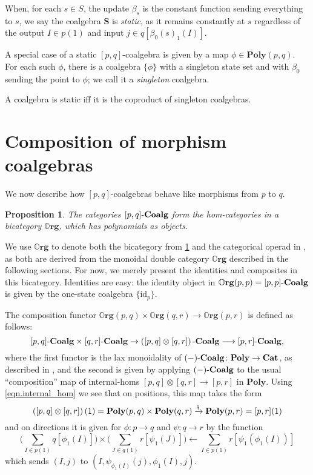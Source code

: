 \documentclass[11pt, one side, article]{memoir}
\theoremstyle{definition}
\theoremstyle{plain}
\newtheorem{proposition}[definitionx]{Proposition}
\newenvironment{example}
  {\pushQED{\qed}\renewcommand{\qedsymbol}{$\lozenge$}\examplex}
  {\popQED\endexamplex}
\newcommand{\Cat}[1]{\mathbf{#1}}%
\newcommand{\id}{\mathrm{id}}
\newcommand{\then}{\mathbin{\fatsemi}}
\newcommand{\too}{\longrightarrow}
\newcommand{\To}[2][]{\xrightarrow[#1]{#2}}
\newcommand{\from}{\leftarrow}
\newcommand{\tn}[1]{\textnormal{#1}}
\newcommand{\smcat}{\Cat{Cat}}
\newcommand{\poly}{\Cat{Poly}}
\newcommand{\0}{\textsf{0}}
\newcommand{\1}{\tn{\textsf{1}}}
\newcommand{\coalg}{\tn{-}\Cat{Coalg}}
\newcommand{\org}{{\mathbb{O}\Cat{rg}}}
\renewcommand{\S}{{\Cat{S}}}
\newcommand{\idcoalg}[1]{{\{\id_{#1}\}}}
\newcommand{\dnote}[1]{{\color{blue}David says:}~#1.\quad{\color{blue}$\lozenge$}}
\begin{document}
When, for each $s \in S$, the update $\beta_s$ is the constant function sending everything to $s$, we say the coalgebra $\S$ is \emph{static}, as it remains constantly at $s$ regardless of the output $I \in p(1)$ and input $j\in q[\beta_0(s)_1(I)]$.

\begin{example}\label{ex.single_state}
A special case of a static $[p,q]$-coalgebra is given by a map $\phi \in \poly(p,q)$. For each such $\phi$, there is a coalgebra $\{\phi\}$ with a singleton state set and with $\beta_0$ sending the point to $\phi$; we call it a \emph{singleton} coalgebra. 

A coalgebra is static iff it is the coproduct of singleton coalgebras.
\end{example}



\section{Composition of morphism coalgebras}



We now describe how $[p,q]$-coalgebras behave like morphisms from $p$ to $q$.

\begin{proposition}\label{prop.def_org}
The categories $[p,q]\coalg$ form the hom-categories in a bicategory $\org$, which has polynomials as objects.
\end{proposition}

We use $\org$ to denote both the bicategory from \cref{prop.def_org} and the categorical operad in \cite[Definition 2.19]{spivak2021learners}, as both are derived from the monoidal double category $\org$ described in the following sections. For now, we merely present the identities and composites in this bicategory. Identities are easy: the identity object in $\org(p,p)=[p,p]\coalg$ is given by the one-state coalgebra $\idcoalg{p}$. 

The composition functor $\org(p,q)\times\org(q,r)\too\org(p,r)$ is defined as follows:
\[[p,q]\coalg \times [q,r]\coalg \to \left([p,q] \otimes [q,r]\right)\coalg \too [p,r]\coalg,\]
where the first functor is the lax monoidality of $(-)\coalg\colon\poly \to \smcat$, as described in \cite[Proposition 2.13]{spivak2021learners}, and the second is given by applying $(-)\coalg$ to the usual ``composition'' map of internal-homs $[p,q] \otimes [q,r] \to [p,r]$ in $\poly$. Using \eqref{eqn.internal_hom} we see that on positions, this map takes the form\vspace{-.1cm}
\[\left([p,q] \otimes [q,r]\right)(1) = \poly(p,q) \times \poly(q,r) \To{\then} \poly(p,r) = [p,r](1)\]
and on directions it is given for $\phi\colon p \to q$ and $\psi\colon q \to r$ by the function
\[\bigg(\sum_{I \in p(1)} q[\phi_1(I)]\bigg) \times \bigg(\sum_{J \in q(1)} r[\psi_1(J)]\bigg) \from \sum_{I \in p(1)} r[\psi_1(\phi_1(I))]\]
which sends $(I,j)$ to $(I,\psi_{\phi_1(I)}(j),\phi_1(I),j)$. 
\end{document}
